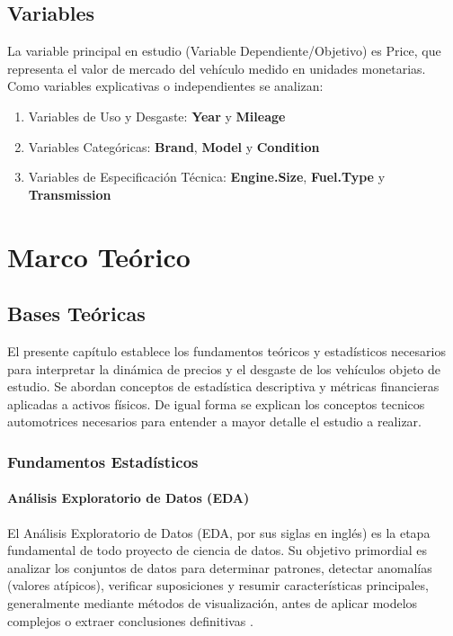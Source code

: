 \documentclass[oneside,11pt]{Latex/Classes/PhDthesisPSnPDF}
\begin{document}
\section{Variables}

La variable principal en estudio (Variable Dependiente/Objetivo) es
Price, que representa el valor de mercado del vehículo medido en
unidades monetarias. Como variables explicativas o independientes se
analizan:

\begin{enumerate}
  \item Variables de Uso y Desgaste: \textbf{Year} y \textbf{Mileage}
  \item Variables Categóricas: \textbf{Brand}, \textbf{Model} y \textbf{Condition}
  \item Variables de Especificación Técnica: \textbf{Engine.Size}, \textbf{Fuel.Type} y \textbf{Transmission}
\end{enumerate}

\chapter{Marco Teórico}

\section{Bases Teóricas}

El presente capítulo establece los fundamentos teóricos y estadísticos
necesarios para interpretar la dinámica de precios y el desgaste de los
vehículos objeto de estudio. Se abordan conceptos de estadística
descriptiva y métricas financieras aplicadas a activos físicos. De igual
forma se explican los conceptos tecnicos automotrices necesarios para
entender a mayor detalle el estudio a realizar.

\subsection{Fundamentos Estadísticos}

\subsubsection{Análisis Exploratorio de Datos (EDA)}

El Análisis Exploratorio de Datos (EDA, por sus siglas en inglés) es la
etapa fundamental de todo proyecto de ciencia de datos. Su objetivo
primordial es analizar los conjuntos de datos para determinar patrones,
detectar anomalías (valores atípicos), verificar suposiciones y resumir
características principales, generalmente mediante métodos de
visualización, antes de aplicar modelos complejos o extraer conclusiones
definitivas \citep{tukey1977}.
\end{document}
